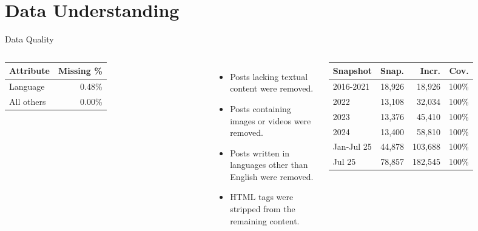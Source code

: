 \documentclass[aspectratio=169,xcolor=dvipsnames]{beamer}
\begin{document}
\section{Data Understanding}

\begin{frame}{Data Quality }
	\begin{columns}[c]
		\begin{table}
			\centering
			\begin{tabular}{lr}
				\toprule
				\textbf{Attribute} & \textbf{Missing \%} \\
				\midrule
				Language           & 0.48\%              \\
				All others         & 0.00\%              \\
				\bottomrule
			\end{tabular}
		\end{table}

		\begin{itemize}
			\item Posts lacking textual content were removed.
			\item Posts containing images or videos were removed.
			\item Posts written in languages other than English were removed.
			\item HTML tags were stripped from the remaining content.
		\end{itemize}

		\begin{table}
			\centering
			\footnotesize
			\begin{tabular}{lrrr}
				\toprule
				\textbf{Snapshot} & \textbf{Snap.} & \textbf{Incr.} & \textbf{Cov.} \\
				\midrule
				2016-2021         & 18,926         & 18,926         & 100\%         \\
				2022              & 13,108         & 32,034         & 100\%         \\
				2023              & 13,376         & 45,410         & 100\%         \\
				2024              & 13,400         & 58,810         & 100\%         \\
				Jan-Jul 25        & 44,878         & 103,688        & 100\%         \\
				Jul 25            & 78,857         & 182,545        & 100\%         \\
				\bottomrule
			\end{tabular}
		\end{table}
	\end{columns}
\end{frame}
\end{document}
